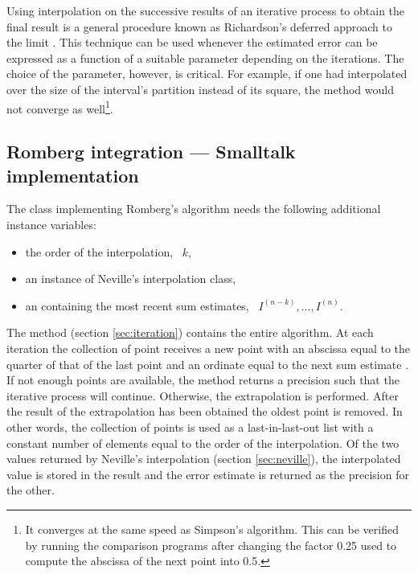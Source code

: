 Using interpolation on the successive results of an iterative
process to obtain the final result is a general procedure known as
Richardson's deferred approach to the limit \cite{Press}. This
technique can be used whenever the estimated error can be
expressed as a function of a suitable parameter depending on the
iterations. The choice of the parameter, however, is critical. For
example, if one had interpolated over the size of the interval's
partition instead of its square, the method would not converge as
well\footnote{It converges at the same speed as Simpson's
algorithm. This can be verified by running the comparison programs
after changing the factor 0.25 used to compute the abscissa of the
next point into 0.5.}.

\subsection{Romberg integration --- Smalltalk implementation}
\label{sec:sromberg}
The class implementing Romberg's algorithm needs the following
additional instance variables:
\begin{itemize}
\item {} the order of the interpolation, \ie\ $k$,\\
\item {} an instance of Neville's interpolation class,\\
\item {} an  containing the most recent sum estimates,
\ie\ $I^{\left(n-k\right)},\ldots,I^{\left(n\right)}$.\\
\end{itemize}
The method  (\cf section \ref{sec:iteration}) contains the entire algorithm. At each iteration the collection of point receives a new point with an
abscissa equal to the quarter of that of the last point and an
ordinate equal to the next sum estimate . If not enough points are
available, the method returns a precision such that the iterative
process will continue. Otherwise, the extrapolation is performed.
After the result of the extrapolation has been obtained the oldest
point is removed. In other words, the collection of points is used
as a last-in-last-out list with a constant number of elements
equal to the order of the interpolation. Of the two values
returned by Neville's interpolation (\cf section \ref{sec:neville}), the interpolated value is stored in the result
and the error estimate is returned as the precision for the other.

